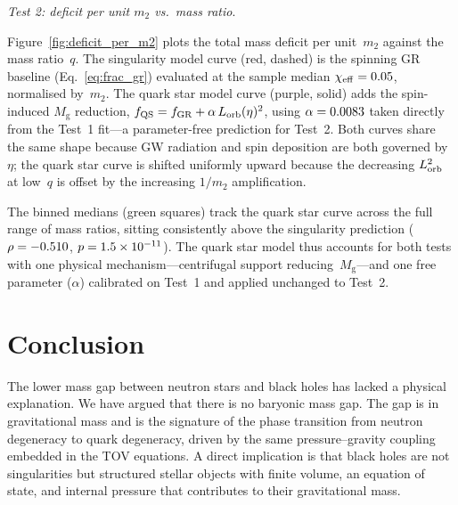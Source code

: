 \documentclass[manuscript,linenumbers]{aastex701}
\newcommand{\Mg}{M_{\mathrm{g}}}
\renewcommand{\paragraph}[1]{\par\medskip\noindent\textit{#1}.\ }
\begin{document}
\paragraph{Test 2: deficit per unit $m_2$ vs.\ mass ratio}

Figure~\ref{fig:deficit_per_m2} plots the total mass deficit per
unit~$m_2$ against the mass ratio~$q$.  The singularity model curve
(red, dashed) is the spinning GR baseline (Eq.~\ref{eq:frac_gr})
evaluated at the sample median $\chi_{\rm eff} = 0.05$,
normalised by~$m_2$.  The quark star model curve (purple, solid) adds
the spin-induced $\Mg$ reduction,
$f_{\rm QS} = f_{\rm GR} + \alpha\,L_{\rm orb}(\eta)^{2}$,
using $\alpha = 0.0083$ taken directly from the Test~1 fit---a
parameter-free prediction for Test~2.  Both curves share the same
shape because GW radiation and spin deposition are both governed
by~$\eta$; the quark star curve is shifted uniformly upward because
the decreasing $L_{\rm orb}^{2}$ at low~$q$ is offset by the
increasing $1/m_2$ amplification.

The binned medians (green squares) track the quark star curve across
the full range of mass ratios, sitting consistently above the
singularity prediction ($\rho = -0.510$, $p = 1.5 \times 10^{-11}$).
The quark star model thus accounts for both tests with one physical
mechanism---centrifugal support reducing~$\Mg$---and one free
parameter ($\alpha$) calibrated on Test~1 and applied unchanged to
Test~2.

\section{Conclusion}\label{s:conclusion}

The lower mass gap between neutron stars and black holes has lacked a
physical explanation.  We have argued that there is no baryonic mass
gap. The gap is in gravitational mass and is the signature of the
phase transition from neutron degeneracy to quark degeneracy, driven
by the same pressure--gravity coupling embedded in the TOV equations.
A direct implication is that black holes are not singularities but
structured stellar objects with finite volume, an equation of state,
and internal pressure that contributes to their gravitational mass.
\end{document}
